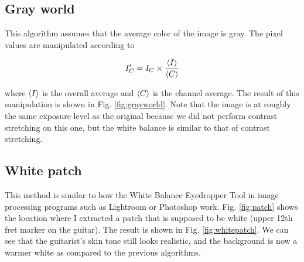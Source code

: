 \documentclass[12pt,a4paper]{article}
\begin{document}
\subsection{Gray world}
This algorithm assumes that the average color of the image is gray. The pixel values are manipulated according to \cite{soriano}

\begin{equation}\label{eq:grayworld}
	I_C^\prime = I_C \times \frac{\ev{I}}{\ev{C}}
\end{equation}

\noindent
where $\ev{I}$ is the overall average and $\ev{C}$ is the channel average. The result of this manipulation is shown in Fig. \ref{fig:grayworld}. Note that the image is at roughly the same exposure level as the original because we did not perform contrast stretching on this one, but the white balance is similar to that of contrast stretching.

\subsection{White patch}
This method is similar to how the White Balance Eyedropper Tool in image processing programs such as Lightroom or Photoshop work. Fig. \ref{fig:patch} shows the location where I extracted a patch that is supposed to be white (upper 12th fret marker on the guitar). The result is shown in Fig. \ref{fig:whitepatch}. We can see that the guitarist's skin tone still looks realistic, and the background is now a warmer white as compared to the previous algorithms.
\end{document}
